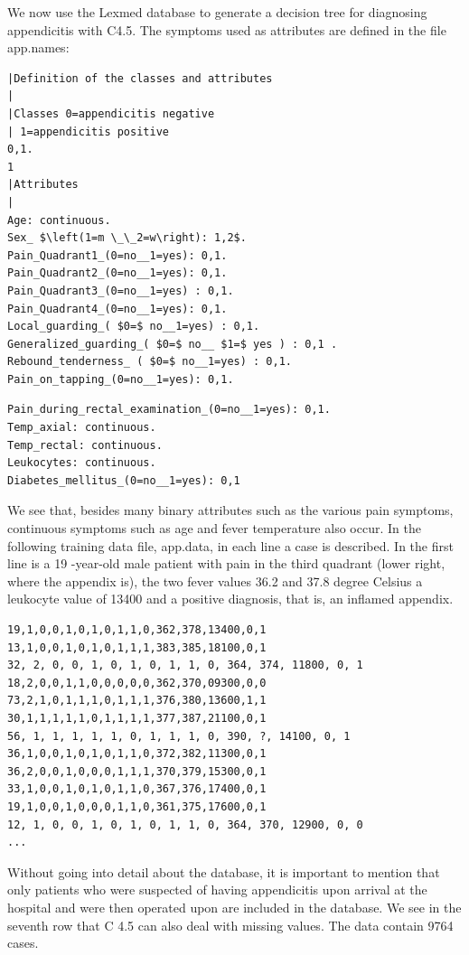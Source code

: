 \documentclass[10pt]{book}
\begin{document}
We now use the Lexmed database to generate a decision tree for diagnosing appendicitis with C4.5. The symptoms used as attributes are defined in the file app.names:

\begin{verbatim}
|Definition of the classes and attributes
|
|Classes 0=appendicitis negative
| 1=appendicitis positive
0,1.
1
|Attributes
|
Age: continuous.
Sex_ $\left(1=m \_\_2=w\right): 1,2$.
Pain_Quadrant1_(0=no__1=yes): 0,1.
Pain_Quadrant2_(0=no__1=yes): 0,1.
Pain_Quadrant3_(0=no__1=yes) : 0,1.
Pain_Quadrant4_(0=no__1=yes): 0,1.
Local_guarding_( $0=$ no__1=yes) : 0,1.
Generalized_guarding_( $0=$ no__ $1=$ yes ) : 0,1 .
Rebound_tenderness_ ( $0=$ no__1=yes) : 0,1.
Pain_on_tapping_(0=no__1=yes): 0,1.
\end{verbatim}

\begin{verbatim}
Pain_during_rectal_examination_(0=no__1=yes): 0,1.
Temp_axial: continuous.
Temp_rectal: continuous.
Leukocytes: continuous.
Diabetes_mellitus_(0=no__1=yes): 0,1
\end{verbatim}

We see that, besides many binary attributes such as the various pain symptoms, continuous symptoms such as age and fever temperature also occur. In the following training data file, app.data, in each line a case is described. In the first line is a 19 -year-old male patient with pain in the third quadrant (lower right, where the appendix is), the two fever values 36.2 and 37.8 degree Celsius a leukocyte value of 13400 and a positive diagnosis, that is, an inflamed appendix.

\begin{verbatim}
19,1,0,0,1,0,1,0,1,1,0,362,378,13400,0,1
13,1,0,0,1,0,1,0,1,1,1,383,385,18100,0,1
32, 2, 0, 0, 1, 0, 1, 0, 1, 1, 0, 364, 374, 11800, 0, 1
18,2,0,0,1,1,0,0,0,0,0,362,370,09300,0,0
73,2,1,0,1,1,1,0,1,1,1,376,380,13600,1,1
30,1,1,1,1,1,0,1,1,1,1,377,387,21100,0,1
56, 1, 1, 1, 1, 1, 0, 1, 1, 1, 0, 390, ?, 14100, 0, 1
36,1,0,0,1,0,1,0,1,1,0,372,382,11300,0,1
36,2,0,0,1,0,0,0,1,1,1,370,379,15300,0,1
33,1,0,0,1,0,1,0,1,1,0,367,376,17400,0,1
19,1,0,0,1,0,0,0,1,1,0,361,375,17600,0,1
12, 1, 0, 0, 1, 0, 1, 0, 1, 1, 0, 364, 370, 12900, 0, 0
...
\end{verbatim}

Without going into detail about the database, it is important to mention that only patients who were suspected of having appendicitis upon arrival at the hospital and were then operated upon are included in the database. We see in the seventh row that C 4.5 can also deal with missing values. The data contain 9764 cases.
\end{document}

